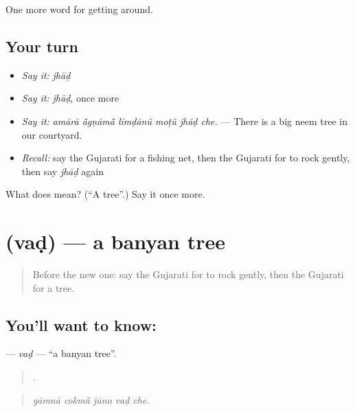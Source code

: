 \begin{grammarlens}[title={What you've built}]
One more word for getting around.
\end{grammarlens}

\subsection*{Your turn}
\begin{itemize}
\raggedright
  \item \emph{Say it:} \emph{jhāḍ}
  \item \emph{Say it:} \emph{jhāḍ}, once more
  \item \emph{Say it:} \emph{amārā ā̃gṇāmā̃ līmḍānũ moṭũ jhāḍ che.} — There is a big neem tree in our courtyard.
  \item \emph{Recall:} say the Gujarati for a fishing net, then the Gujarati for to rock gently, then say \emph{jhāḍ} again
\end{itemize}

\begin{tcolorbox}[breakable,colback=teal!4,colframe=teal!35!black,title={Before you move on}]
What does  mean? (\textquotedblleft{}A tree\textquotedblright{}.) Say it once more.
\end{tcolorbox}
\section[\texorpdfstring{\gu{વડ} (vaḍ)}{વડ (vaḍ)}]{ (vaḍ) — a banyan tree}

\label{lesson:GU-C443-vad}



\begin{quote}
Before the new one: say the Gujarati for to rock gently, then the Gujarati for a tree.
\end{quote}

\subsection*{You'll want to know: }
\textbf{} — \emph{vaḍ} — \textquotedblleft{}a banyan tree\textquotedblright{}.

\begin{quote}
    .
\end{quote}

\begin{quote}
\emph{gāmnā cokmā̃ jūno vaḍ che.}
\end{quote}

